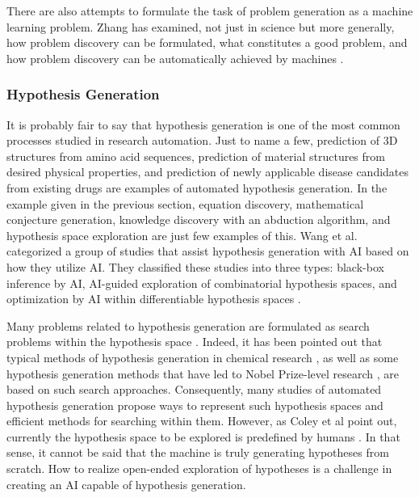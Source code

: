 \documentclass{article}
\begin{document}
There are also attempts to formulate the task of problem generation as a machine learning problem. Zhang has examined, not just in science but more generally, how problem discovery can be formulated, what constitutes a good problem, and how problem discovery can be automatically achieved by machines \cite{zhang2021problem}. %







\subsubsection{Hypothesis Generation}
It is probably fair to say that hypothesis generation is one of the most common processes studied in research automation. Just to name a few, prediction of 3D structures from amino acid sequences, prediction of material structures from desired physical properties, and prediction of newly applicable disease candidates from existing drugs are examples of automated hypothesis generation. In the example given in the previous section, equation discovery, mathematical conjecture generation, knowledge discovery with an abduction algorithm, and hypothesis space exploration are just few examples of this. Wang et al. categorized a group of studies that assist hypothesis generation with AI based on how they utilize AI. They classified these studies into three types: black-box inference by AI, AI-guided exploration of combinatorial hypothesis spaces, and optimization by AI within differentiable hypothesis spaces \cite{wang2023scientific}. 

Many problems related to hypothesis generation are formulated as search problems within the hypothesis space \cite{langley1987scientific}. Indeed, it has been pointed out that typical methods of hypothesis generation in chemical research \cite{coley2020autonomous}, as well as some hypothesis generation methods that have led to Nobel Prize-level research \cite{kitano2021nobel}, are based on such search approaches. Consequently, many studies of automated hypothesis generation propose ways to represent such hypothesis spaces and efficient methods for searching within them. However, as Coley et al point out, currently the hypothesis space to be explored is predefined by humans \cite{coley2020autonomousII}. In that sense, it cannot be said that the machine is truly generating hypotheses from scratch. How to realize open-ended exploration of hypotheses is a challenge in creating an AI capable of hypothesis generation.
\end{document}
